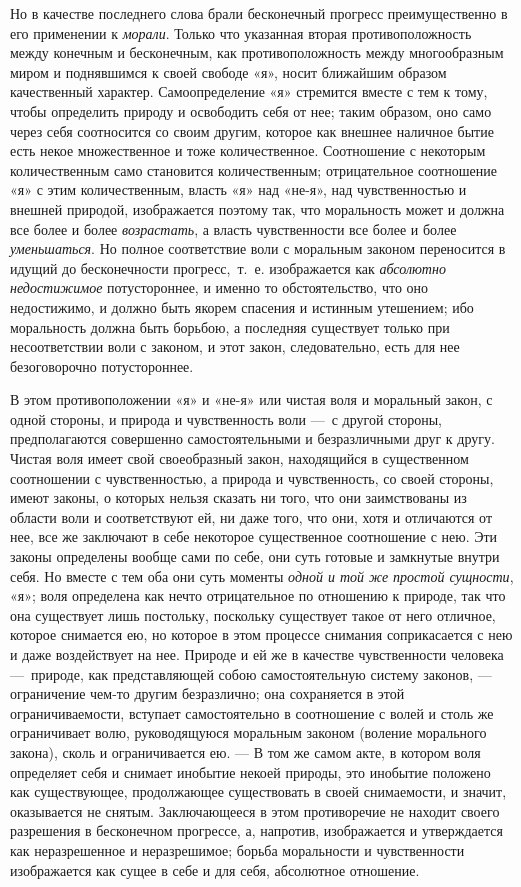 Но в качестве последнего слова брали бесконечный прогресс преимущественно в
его применении к {\em морали}. Только что указанная
вторая противоположность между конечным и бесконечным, как
противоположность между многообразным миром и поднявшимся к своей свободе
«я», носит ближайшим образом качественный характер. Самоопределение «я»
стремится вместе с тем к тому, чтобы определить природу и освободить себя
от нее; таким образом, оно само через себя соотносится со своим другим,
которое как внешнее наличное бытие есть некое множественное и тоже
количественное. Соотношение с некоторым количественным само становится
количественным; отрицательное соотношение «я» с этим количественным, власть
«я» над «не-я», над чувственностью и внешней природой, изображается поэтому
так, что моральность может и должна все более и более
{\em возрастать}, а власть чувственности все более и
более {\em уменьшаться}. Но полное соответствие воли с
моральным законом переносится в идущий до бесконечности прогресс,~т.~е.
изображается как {\em абсолютно недостижимое}
потустороннее, и именно то обстоятельство, что оно недостижимо, и должно
быть якорем спасения и истинным утешением; ибо моральность должна быть
борьбою, а последняя существует только при несоответствии воли с законом, и
этот закон, следовательно, есть для нее безоговорочно потустороннее.

В этом противоположении «я» и «не-я» или чистая воля и моральный закон, с
одной стороны, и природа и чувственность воли —~с другой стороны,
предполагаются совершенно самостоятельными и безразличными друг к другу.
Чистая воля имеет свой своеобразный закон, находящийся в существенном
соотношении с чувственностью, а природа и чувственность, со своей стороны,
имеют законы, о которых нельзя сказать ни того, что они заимствованы из
области воли и соответствуют ей, ни даже того, что они, хотя и отличаются
от нее, все же заключают в себе некоторое существенное соотношение с нею.
Эти законы определены вообще сами по себе, они суть готовые и замкнутые
внутри себя. Но вместе с тем оба они суть моменты
{\em одной и той же простой сущности}, «я»; воля
определена как нечто отрицательное по отношению к природе, так что она
существует лишь постольку, поскольку существует такое от него отличное,
которое снимается ею, но которое в этом процессе снимания соприкасается с
нею и даже воздействует на нее. Природе и ей же в качестве чувственности
человека —~природе, как представляющей собою самостоятельную систему
законов, — ограничение чем-то другим безразлично; она сохраняется в этой
ограничиваемости, вступает самостоятельно в соотношение с волей и столь же
ограничивает волю, руководящуюся моральным законом (воление морального
закона), сколь и ограничивается ею. — В том же самом акте, в котором воля
определяет себя и снимает инобытие некоей природы, это инобытие положено
как существующее, продолжающее существовать в своей снимаемости, и значит,
оказывается не снятым. Заключающееся в этом противоречие не находит своего
разрешения в бесконечном прогрессе, а, напротив, изображается и
утверждается как неразрешенное и неразрешимое; борьба моральности и
чувственности изображается как сущее в себе и для себя, абсолютное
отношение.

